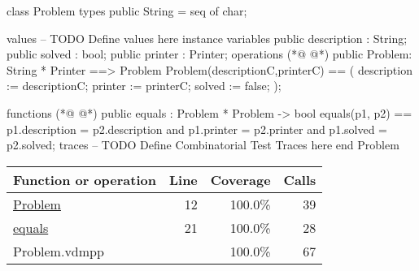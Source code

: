 \begin{vdmpp}[breaklines=true]
class Problem
types
 public String = seq of char;
 
values
-- TODO Define values here
instance variables
 public description : String;
 public solved : bool;
 public printer : Printer;
operations
(*@
\label{Problem:12}
@*)
 public Problem: String * Printer ==> Problem
 Problem(descriptionC,printerC) == (
   description := descriptionC;
   printer := printerC;
   solved := false;
  );
  
  
functions
(*@
\label{equals:21}
@*)
public equals : Problem * Problem -> bool
equals(p1, p2) ==
  p1.description = p2.description and p1.printer = p2.printer and p1.solved = p2.solved;
traces
-- TODO Define Combinatorial Test Traces here
end Problem
\end{vdmpp}
\bigskip
\begin{longtable}{|l|r|r|r|}
\hline
Function or operation & Line & Coverage & Calls \\
\hline
\hline
\hyperref[Problem:12]{Problem} & 12&100.0\% & 39 \\
\hline
\hyperref[equals:21]{equals} & 21&100.0\% & 28 \\
\hline
\hline
Problem.vdmpp & & 100.0\% & 67 \\
\hline
\end{longtable}

